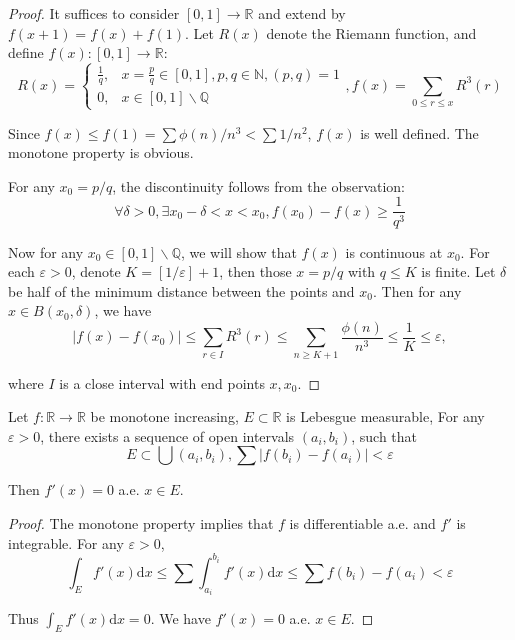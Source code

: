 \begin{proof}
	It suffices to consider $ [0,1]\to \mathbb{R} $ and extend by $ f(x+1)=f(x)+f(1) $. Let $ R(x) $ denote the Riemann function, and define $ f(x)\colon [0,1]\to \mathbb{R}  $:
	$$
	R( x ) =
	\begin{cases}
	\frac{1}{q}, & x=\frac{p}{q}\in[0,1],p,q\in \mathbb{N},\left( p,q \right) =1\\
			0, & x\in [0,1]\backslash \mathbb{Q}
	\end{cases},f( x ) =\sum_{0\le r\le x}^{}{R^3( r )}
	$$
	
	Since $ f(x)\le f(1)=\sum \phi(n)/n^{3}<\sum 1/n^{2} $, $ f(x) $ is well defined. The monotone property is obvious. 
	
	For any $ x_{0}=p/q $, the discontinuity follows from the observation:
	$$
	\forall \delta >0,\exists x_0-\delta <x<x_0,f( x_0 ) -f( x ) \ge \frac{1}{q^3}
	$$
	
	Now for any $ x_{0}\in [0,1]\backslash \mathbb{Q}  $, we will show that $ f(x) $ is continuous at $ x_{0} $. For each $ \varepsilon>0 $, denote $ K=[1/\varepsilon]+1 $, then those $ x=p/q $ with $ q\le K $ is finite. Let $ \delta  $ be half of the minimum distance between the points and $ x_{0} $. Then for any $ x\in B(x_{0},\delta) $, we have
	$$
	|f( x ) -f( x_0 ) |\le \sum_{r\in I}^{}{R^3( r )}\le \sum_{n\ge K+1}^{}{\frac{\phi ( n )}{n^3}}\le \frac{1}{K}\le \varepsilon,
	$$
	
	where $ I $ is a close interval with end points $ x,x_{0} $.
	
\end{proof}

\begin{problem}
Let $ f\colon\mathbb{R} \to \mathbb{R}  $ be monotone increasing, $ E\subset\mathbb{R}  $ is Lebesgue measurable, For any $ \varepsilon>0 $, there exists a sequence of open intervals $ (a_{i},b_{i}) $, such that
\[
 E\subset \bigcup (a_{i},b_{i}), \sum |f(b_{i})-f(a_{i})|<\varepsilon 
\]

Then $ f'(x)=0 $ a.e. $ x\in E $.
\end{problem}

\begin{proof}
	 The monotone property implies that $ f $ is differentiable a.e. and $ f' $ is integrable. For any $ \varepsilon>0 $,
	$$
	\int_E^{}{f'( x ) \mathrm{d} x}\le \sum_{}^{}{\int_{a_{i}}^{b_{i}}{f'( x ) \mathrm{d} x}}\le \sum_{}^{}{f( b_{i} ) -f( a_{i} )}<\varepsilon 
	$$
	
	Thus $ \int_{E}f'(x)\mathrm{d} x=0 $. We have $ f'(x)=0 $ a.e. $ x\in E $.
\end{proof}

